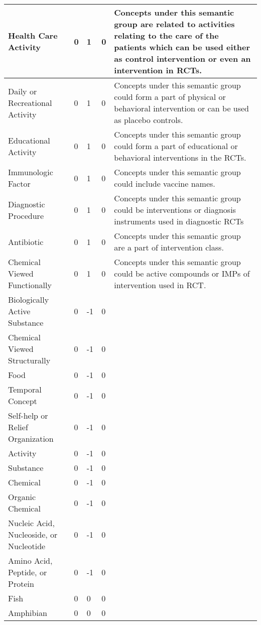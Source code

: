\documentclass[10.7pt,]{article}
\begin{document}
\begin{longtable}{|l|p{0.3cm}|p{0.3cm}|p{0.3cm}|p{7.9cm}|}
        Health Care Activity & 0 & 1 & 0 & Concepts under this semantic group are related to activities relating to the care of the patients which can be used either as control intervention or even an intervention in RCTs. \\ \hline
        Daily or Recreational Activity & 0 & 1 & 0 & Concepts under this semantic group could form a part of physical or behavioral intervention or can be used as placebo controls. \\ \hline
        Educational Activity & 0 & 1 & 0 & Concepts under this semantic group could form a part of educational or behavioral interventions in the RCTs. \\ \hline
        Immunologic Factor & 0 & 1 & 0 & Concepts under this semantic group could include vaccine names. \\ \hline
        Diagnostic Procedure & 0 & 1 & 0 & Concepts under this semantic group could be interventions or diagnosis instruments used in diagnostic RCTs \\ \hline
        Antibiotic & 0 & 1 & 0 & Concepts under this semantic group are a part of intervention class. \\ \hline
        Chemical Viewed Functionally & 0 & 1 & 0 & Concepts under this semantic group could be active compounds or IMPs of intervention used in RCT. \\ \hline
        Biologically Active Substance & 0 & -1 & 0 & ~ \\ \hline
        Chemical Viewed Structurally & 0 & -1 & 0 & ~ \\ \hline
        Food & 0 & -1 & 0 & ~ \\ \hline
        Temporal Concept & 0 & -1 & 0 & ~ \\ \hline
        Self-help or Relief Organization & 0 & -1 & 0 & ~ \\ \hline
        Activity & 0 & -1 & 0 & ~ \\ \hline
        Substance & 0 & -1 & 0 & ~ \\ \hline
        Chemical & 0 & -1 & 0 & ~ \\ \hline
        Organic Chemical & 0 & -1 & 0 & ~ \\ \hline
        Nucleic Acid, Nucleoside, or Nucleotide & 0 & -1 & 0 & ~ \\ \hline
        Amino Acid, Peptide, or Protein & 0 & -1 & 0 & ~ \\ \hline
        Fish & 0 & 0 & 0 & ~ \\ \hline
        Amphibian & 0 & 0 & 0 & ~ \\ \hline

\end{longtable}
\end{document}
